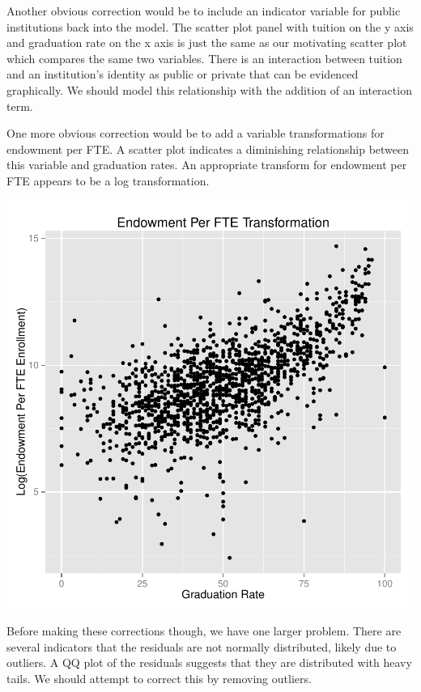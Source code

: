 \documentclass{article}
\begin{document}
Another obvious correction would be to include an indicator variable for public institutions back into the model. The scatter plot panel with tuition on the y axis and graduation rate on the x axis is just the same as our motivating scatter plot which compares the same two variables. There is an interaction between tuition and an institution's identity as public or private that can be evidenced graphically. We should model this relationship with the addition of an interaction term.

One more obvious correction would be to add a variable transformations for endowment per FTE. A scatter plot indicates a diminishing relationship between this variable and graduation rates. An appropriate transform for endowment per FTE appears to be a log transformation.

\includegraphics{Fig-transforms}

\FloatBarrier

Before making these corrections though, we have one larger problem. There are several indicators that the residuals are not normally distributed, likely due to outliers. A QQ plot of the residuals suggests that they are distributed with heavy tails. We should attempt to correct this by removing outliers.
\end{document}
